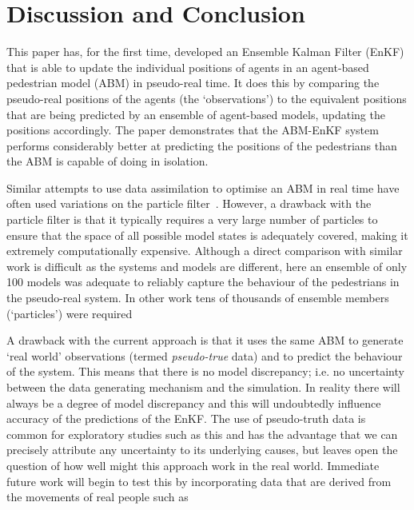 \documentclass{article}
\begin{document}
\section{Discussion and Conclusion}\label{sec:conc}

This paper has, for the first time, developed an Ensemble Kalman Filter (EnKF) that is able to update the individual positions of agents in an agent-based pedestrian model (ABM) in pseudo-real time. It does this by comparing the pseudo-real positions of the agents (the `observations') to the equivalent positions that are being predicted by an ensemble of agent-based models, updating the positions accordingly. The paper demonstrates that the ABM-EnKF system performs considerably better at predicting the positions of the pedestrians than the ABM is capable of doing in isolation. 

Similar attempts to use data assimilation to optimise an ABM in real time have often used variations on the particle filter~\citep{wang_data_2015, kieu_dealing_2020, malleson2020simulating, ternes_data_2021}. However, a drawback with the particle filter is that it typically requires a very large number of particles to ensure that the space of all possible model states is adequately covered, making it extremely computationally expensive. Although a direct comparison with similar work is difficult as the systems and models are different, here an ensemble of only 100 models was adequate to reliably capture the behaviour of the pedestrians in the pseudo-real system. In other work tens of thousands of ensemble members (`particles') were required~\citep{malleson_simulating_2020} 

A drawback with the current approach is that it uses the same ABM to generate `real world' observations (termed \textit{pseudo-true} data) and to predict the behaviour of the system. This means that there is no model discrepancy; i.e. no uncertainty between the data generating mechanism and the simulation. In reality there will always be a degree of model discrepancy and this will undoubtedly influence accuracy of the predictions of the EnKF. The use of pseudo-truth data is common for exploratory studies such as this \citep[see for example][]{wang_data_2015, malleson2020simulating} and has the advantage that we can precisely attribute any uncertainty to its underlying causes, but leaves open the question of how well might this approach work in the real world. Immediate future work will begin to test this by incorporating data that are derived from the movements of real people such as \citet{zhou_understanding_2012}
\end{document}
